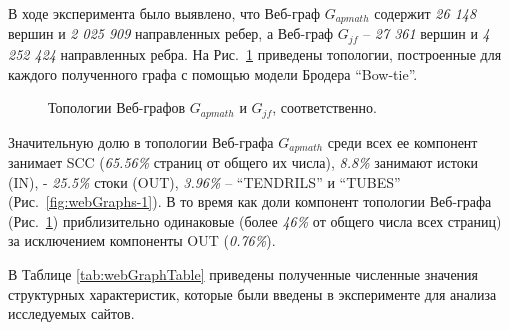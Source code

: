 В ходе эксперимента было выявлено, что Веб-граф \(G_{apmath}\) содержит \textit{26 148} вершин и \textit{2 025 909} направленных ребер, а Веб-граф \(G_{jf}\) -- \textit{27 361} вершин и \textit{4 252 424} направленных ребра. На  Рис.~\cref{fig:webGraphs} приведены топологии, построенные для каждого полученного графа с помощью модели Бродера “Bow-tie”.

\begin{figure}[ht]
    \caption{Топологии Веб-графов \(G_{apmath}\) и \(G_{jf}\), соответственно.}\label{fig:webGraphs}
\end{figure}

Значительную долю в топологии Веб-графа \(G_{apmath}\) среди всех ее компонент занимает SCC (\textit{65.56\%} страниц от общего их числа), \textit{8.8\%} занимают истоки (IN), - \textit{25.5\%} стоки (OUT), \textit{3.96\%} -- “TENDRILS” и “TUBES” (Рис.~\cref{fig:webGraphs-1}). В то время как доли компонент топологии Веб-графа (Рис.~\cref{fig:webGraphs}) приблизительно одинаковые (более \textit{46\%} от общего числа всех страниц) за исключением компоненты OUT (\textit{0.76\%}).

В Таблице \cref{tab:webGraphTable} приведены полученные численные значения структурных характеристик, которые были введены в эксперименте для анализа исследуемых сайтов.


